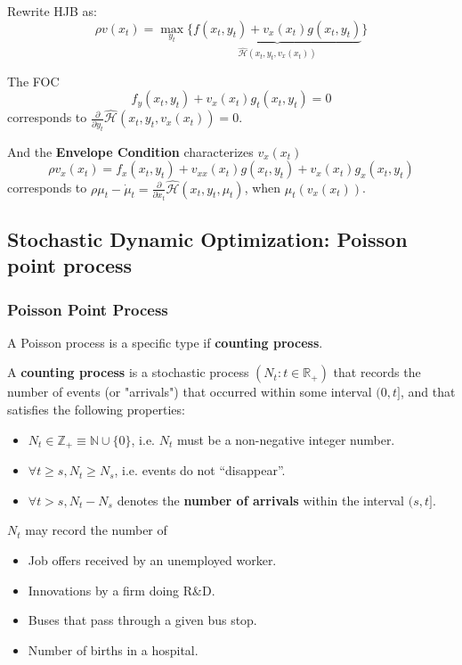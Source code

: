 \begin{remark*}
    Rewrite HJB as:
    \[
        \rho v(x_t) = \max_{y_t} \{\underbrace{f(x_t,y_t) + v_x(x_t)g(x_t,y_t)}_{\hat{\mathcal{H}}(x_t,y_t,v_x(x_t))}\}
    \]

    The FOC \[
        f_y(x_t,y_t) + v_x(x_t)g_t(x_t,y_t) = 0
    \] corresponds to $\frac{\partial }{\partial y_t}\hat{\mathcal{H}}(x_t,y_t,v_x(x_t)) = 0$.

    And the \textbf{Envelope Condition} characterizes $v_x(x_t)$ \[
        \rho v_x(x_t) = f_x(x_t,y_t) + v_{xx}(x_t)g(x_t,y_t) + v_x(x_t)g_x(x_t,y_t)
    \] corresponds to $\rho \mu_t - \dot{\mu}_t = \frac{\partial }{\partial x_t}\hat{\mathcal{H}}(x_t,y_t,\mu_t)$, when $\mu_t(v_x(x_t))$.
\end{remark*}

\subsection{Stochastic Dynamic Optimization: Poisson point process}

\subsubsection{Poisson Point Process} A Poisson process is a specific type if \textbf{counting process}.
\begin{definition}
    A \textbf{counting process} is a stochastic process $(N_t:t \in \mathbb{R}_+)$ that records the number of events (or "arrivals") that occurred within some interval $(0,t]$, and that satisfies the following properties: \begin{itemize}
        \item $N_t \in \mathbb{Z}_+ \equiv \mathbb{N}\cup\{0\}$, i.e. $N_t$ must be a non-negative integer number.
        \item $\forall t \geq s, N_t \geq N_s$, i.e. events do not ``disappear''.
        \item $\forall t > s, N_t-N_s$ denotes the \textbf{number of arrivals} within the interval $(s,t]$.
    \end{itemize}
    \begin{example*} $N_t$ may record the number of \begin{itemize}
            \item Job offers received by an unemployed worker.
            \item Innovations by a firm doing R\&D.
            \item Buses that pass through a given bus stop.
            \item Number of births in a hospital.
        \end{itemize}
    \end{example*}
\end{definition}


